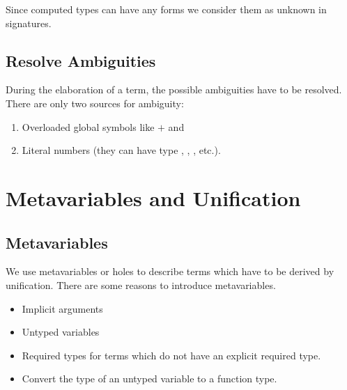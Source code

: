 Since computed types can have any forms we consider them as unknown in
signatures.










\subsection{Resolve Ambiguities}

During the elaboration of a term, the possible ambiguities have to be resolved.
There are only two sources for ambiguity:
%
\begin{enumerate}

\item Overloaded global symbols like $+$ and 

\item Literal numbers (they can have type , ,
, etc.).

\end{enumerate}








\section{Metavariables and Unification}


\subsection{Metavariables}

We use metavariables or holes to describe terms which have to be derived by
unification. There are some reasons to introduce metavariables.

\begin{itemize}

\item Implicit arguments

\item Untyped variables

\item Required types for terms which do not have an explicit required type.

\item Convert the type of an untyped variable to a function type.

\end{itemize}


